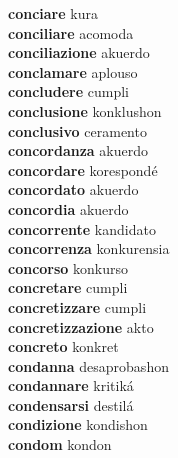 \textbf{conciare } kura \\
\textbf{conciliare } acomoda \\
\textbf{conciliazione } akuerdo \\
\textbf{conclamare } aplouso \\
\textbf{concludere } cumpli \\
\textbf{conclusione } konklushon \\
\textbf{conclusivo } ceramento \\
\textbf{concordanza } akuerdo \\
\textbf{concordare } korespondé \\
\textbf{concordato } akuerdo \\
\textbf{concordia } akuerdo \\
\textbf{concorrente } kandidato \\
\textbf{concorrenza } konkurensia \\
\textbf{concorso } konkurso \\
\textbf{concretare } cumpli \\
\textbf{concretizzare } cumpli \\
\textbf{concretizzazione } akto \\
\textbf{concreto } konkret \\
\textbf{condanna } desaprobashon \\
\textbf{condannare } kritiká \\
\textbf{condensarsi } destilá \\
\textbf{condizione } kondishon \\
\textbf{condom } kondon \\
